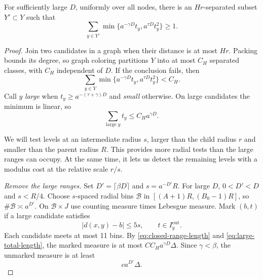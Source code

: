\begin{lemma}
\label{lem:separated-capacity}
For sufficiently large $D$, uniformly over all nodes, there is an
$Hr$-separated subset $Y'\subset Y$ such that
\begin{equation}
 \sum_{y\in Y'}\min\{a^{-\gamma D}t_y,a^{\tau D}t_y^2\}\geq1.
 \label{eq:capacity}
\end{equation}
\end{lemma}
\begin{proof}
Join two candidates in a graph when their distance is at most $Hr$.
Packing bounds its degree, so graph coloring partitions $Y$ into at most
$C_H$ separated classes, with $C_H$ independent of $D$. If the conclusion fails, then
\begin{equation}
 \sum_{y\in Y}\min\{a^{-\gamma D}t_y,a^{\tau D}t_y^2\}<C_H.
 \label{eq:failed-capacity}
\end{equation}
Call $y$ \emph{large} when $t_y\geq a^{-(\tau+\gamma)D}$ and
\emph{small} otherwise. On large candidates the minimum is linear, so
\begin{equation}
 \sum_{\text{large }y}t_y\leq C_Ha^{\gamma D}.
 \label{eq:large-total-length}
\end{equation}

We will test levels at an intermediate radius $s$, larger than the
child radius $r$ and smaller than the parent radius $R$. This provides
more radial tests than the large ranges can occupy. At the same time,
it lets us detect the remaining levels with a modulus cost at the
relative scale $r/s$.

\emph{Remove the large ranges.}
Set $D'=\lceil\beta D\rceil$ and $s=a^{-D'}R$. For large $D$,
$0<D'<D$ and $s<R/4$. Choose $s$-spaced radial bins $\mathcal B$
in $[(A+1)R,(B_0-1)R]$, so $\#\mathcal B\asymp a^{D'}$.
On $\mathcal B\times J$ use counting measure times Lebesgue measure.
Mark $(b,t)$ if a large candidate satisfies
\[
 |d(x,y)-b|\leq5s,\qquad t\in I_y^{\mathrm{out}}.
\]
Each candidate meets at most 11 bins. By
\eqref{eq:closed-range-length} and \eqref{eq:large-total-length}, the
marked measure is at most $CC_Ha^{\gamma D}\Delta$. Since $\gamma<\beta$,
the unmarked measure is at least
\begin{equation}
 ca^{D'}\Delta.
 \label{eq:unmarked-mass}
\end{equation}


\end{proof}
